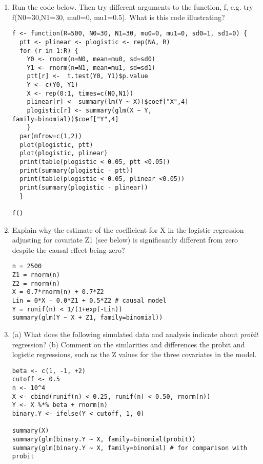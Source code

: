 \documentclass[11pt]{article}
\begin{document}
\begin{enumerate}

\item Run the code below. Then try different arguments to the function, f, e.g. try f(N0=30,N1=30, mu0=0, mu1=0.5). What is this code illustrating?

\begin{spacing}{.25}
\begin{lstlisting}
f <- function(R=500, N0=30, N1=30, mu0=0, mu1=0, sd0=1, sd1=0) {
  ptt <- plinear <- plogistic <- rep(NA, R)
  for (r in 1:R) {
    Y0 <- rnorm(n=N0, mean=mu0, sd=sd0)
    Y1 <- rnorm(n=N1, mean=mu1, sd=sd1)
    ptt[r] <-  t.test(Y0, Y1)$p.value
    Y <- c(Y0, Y1)
    X <- rep(0:1, times=c(N0,N1))
    plinear[r] <- summary(lm(Y ~ X))$coef["X",4]
    plogistic[r] <- summary(glm(X ~ Y, family=binomial))$coef["Y",4]
    }
  par(mfrow=c(1,2))
  plot(plogistic, ptt)
  plot(plogistic, plinear)
  print(table(plogistic < 0.05, ptt <0.05))
  print(summary(plogistic - ptt))
  print(table(plogistic < 0.05, plinear <0.05))
  print(summary(plogistic - plinear))
  }

f()
\end{lstlisting}
\end{spacing}

\item Explain why the estimate of the coefficient for X in the logistic regression adjusting for covariate Z1 (see below) is significantly different from zero despite the causal effect being zero?


\begin{spacing}{.25}
\begin{lstlisting}
n = 2500
Z1 = rnorm(n)
Z2 = rnorm(n)
X = 0.7*rnorm(n) + 0.7*Z2
Lin = 0*X - 0.0*Z1 + 0.5*Z2 # causal model
Y = runif(n) < 1/(1+exp(-Lin))
summary(glm(Y ~ X + Z1, family=binomial))
\end{lstlisting}
\end{spacing}

\item (a) What does the following simulated data and analysis indicate about {\it probit} regression? (b) 
Comment on the simlarities and differences the probit and logistic regressions, such as the Z values for the three covariates in the model.

\begin{spacing}{.25}
\begin{lstlisting}
beta <- c(1, -1, +2)
cutoff <- 0.5
n <- 10^4
X <- cbind(runif(n) < 0.25, runif(n) < 0.50, rnorm(n))
Y <- X %*% beta + rnorm(n)
binary.Y <- ifelse(Y < cutoff, 1, 0)

summary(X)
summary(glm(binary.Y ~ X, family=binomial(probit))
summary(glm(binary.Y ~ X, family=binomial) # for comparison with probit
\end{lstlisting}
\end{spacing}

\end{enumerate}
\end{document}
